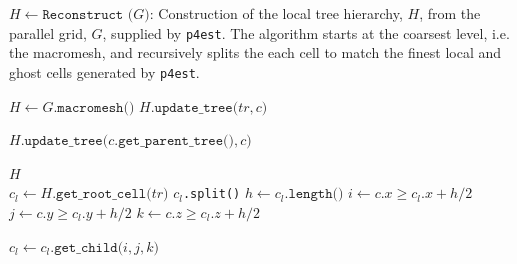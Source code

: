 \begin{algorithm}[htbp]
\caption{$H \gets \texttt{Reconstruct (}G\texttt{)}$: 
Construction of the local tree hierarchy, $H$, from the parallel grid, $G$, supplied by \texttt{p4est}. The algorithm starts at the coarsest level, i.e. the macromesh, and recursively splits the each cell to match the finest local and ghost cells generated by \texttt{p4est}.}
\begin{algorithmic}[1]
\State $H \gets G.\texttt{macromesh()}$ 
 
		\State $H.\texttt{update\_tree(} \mathit{tr}, c \texttt{)}$
	\EndFor
\EndFor

 
	\State $H.\texttt{update\_tree(} c.\texttt{get\_parent\_tree()}, c \texttt{)}$
\EndFor

\State \Return $H$
\\
   
	\State $c_l \gets H.\texttt{get\_root\_cell(}\mathit{tr}\texttt{)}$ 
	 
		 $c_l$\texttt{.split()} 
		\EndIf
		\State $h \gets c_l.\texttt{length()}$ 
		\State $i \gets c.x \ge c_l.x + h/2$	
		\State $j \gets c.y \ge c_l.y + h/2$
		\State $k \gets c.z \ge c_l.z + h/2$

		\State $c_l \gets c_l.\texttt{get\_child(} i, j, k \texttt{)}$
	\EndWhile	
\EndFunction
\end{algorithmic}
\label{alg:reconstruction}
\end{algorithm}

